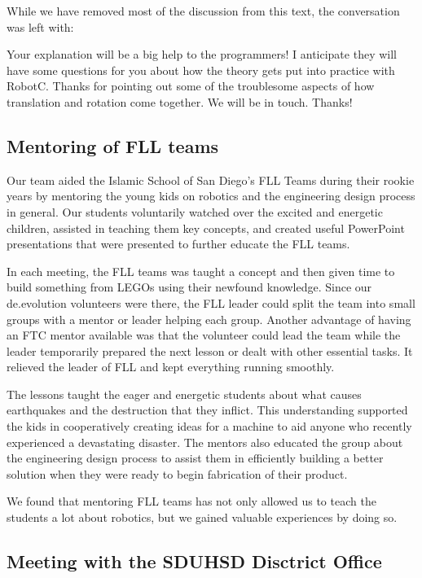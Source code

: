 While we have removed most of the discussion from this text, the conversation was left with:

\begin{fancyquotes}
Your explanation will be a big help to the programmers! I anticipate they will have some questions for you about how the theory gets put into practice with RobotC. Thanks for pointing out some of the troublesome aspects of how translation and rotation come together. We will be in touch. Thanks! 
\end{fancyquotes}

\subsection{Mentoring of FLL teams}
Our team aided the Islamic School of San Diego's FLL Teams during their rookie years by mentoring the young kids on robotics and the engineering design process in general. Our students voluntarily watched over the excited and energetic children, assisted in teaching them key concepts, and created useful PowerPoint presentations that were presented to further educate the FLL teams.

In each meeting, the FLL teams was taught a concept and then given time to build something from LEGOs using their newfound knowledge. Since our de.evolution volunteers were there, the FLL leader could split the team into small groups with a mentor or leader helping each group. Another advantage of having an FTC mentor available was that the volunteer could lead the team while the leader temporarily prepared the next lesson or dealt with other essential tasks. It relieved the leader of FLL and kept everything running smoothly.

The lessons taught the eager and energetic students about what causes earthquakes and the destruction that they inflict. This understanding supported the kids in cooperatively creating ideas for a machine to aid anyone who recently experienced a devastating disaster. The mentors also educated the group about the engineering design process to assist them in efficiently building a better solution when they were ready to begin fabrication of their product.

We found that mentoring FLL teams has not only allowed us to teach the students a lot about robotics, but we gained valuable experiences by doing so.


\subsection{Meeting with the SDUHSD Disctrict Office}

